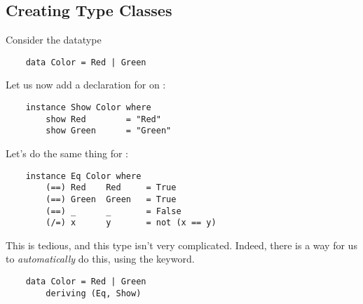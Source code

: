 \documentclass[letterpaper]{article}
\begin{document}
\subsection{Creating Type Classes}
Consider the datatype 
\begin{verbatim}
    data Color = Red | Green \end{verbatim}
Let us now add a declaration for  on :
\begin{verbatim}
    instance Show Color where 
        show Red        = "Red"
        show Green      = "Green"\end{verbatim}

Let's do the same thing for :
\begin{verbatim}
    instance Eq Color where 
        (==) Red    Red     = True 
        (==) Green  Green   = True 
        (==) _      _       = False
        (/=) x      y       = not (x == y)\end{verbatim}
This is tedious, and this type isn't very complicated. Indeed, there is a way for us to \emph{automatically} do this, using the  keyword. 
\begin{verbatim}
    data Color = Red | Green 
        deriving (Eq, Show)\end{verbatim}
\end{document}
